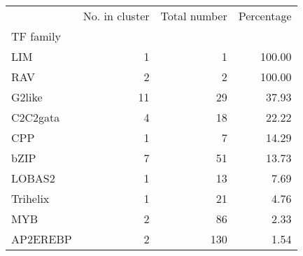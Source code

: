 \begin{tabular}{lrrr}
\toprule
{} &  No. in cluster &  Total number &  Percentage \\
TF family &                 &               &             \\
\midrule
LIM       &               1 &             1 &      100.00 \\
RAV       &               2 &             2 &      100.00 \\
G2like    &              11 &            29 &       37.93 \\
C2C2gata  &               4 &            18 &       22.22 \\
CPP       &               1 &             7 &       14.29 \\
bZIP      &               7 &            51 &       13.73 \\
LOBAS2    &               1 &            13 &        7.69 \\
Trihelix  &               1 &            21 &        4.76 \\
MYB       &               2 &            86 &        2.33 \\
AP2EREBP  &               2 &           130 &        1.54 \\
\bottomrule
\end{tabular}
